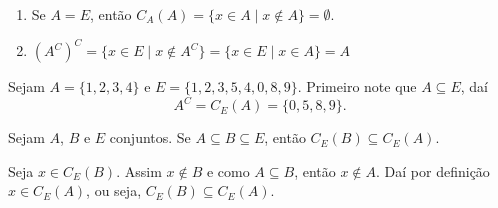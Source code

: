 \begin{observacoes}
    \begin{enumerate}[label={\arabic*})]
        \item Se $A = E$, então $C_A(A) = \{ x \in A \mid x \notin A \} = \emptyset$.
        \item $(A^C)^C = \{x \in E \mid x \notin A^C\} = \{ x \in E \mid x \in A \} = A$
    \end{enumerate}

\end{observacoes}

\begin{exemplo}
    Sejam $A = \{1,2,3,4\}$ e $E = \{1,2,3,5,4,0,8,9\}$. Primeiro note que $A \subseteq E$, daí
    \[
            A^C = C_E(A) = \{0,5,8,9\}.
    \]
\end{exemplo}

\begin{proposicao}
    Sejam $A$, $B$ e $E$ conjuntos. Se $A\subseteq B\subseteq E$, então $C_E(B)\subseteq C_E(A)$.
\end{proposicao}
\begin{prova}
    Seja $x \in C_E(B)$. Assim $x\notin B$ e como $A \subseteq B$, então $x \notin A$. Daí por definição $x\in C_E(A)$, ou seja, $C_E(B) \subseteq C_E(A)$.
\end{prova}

